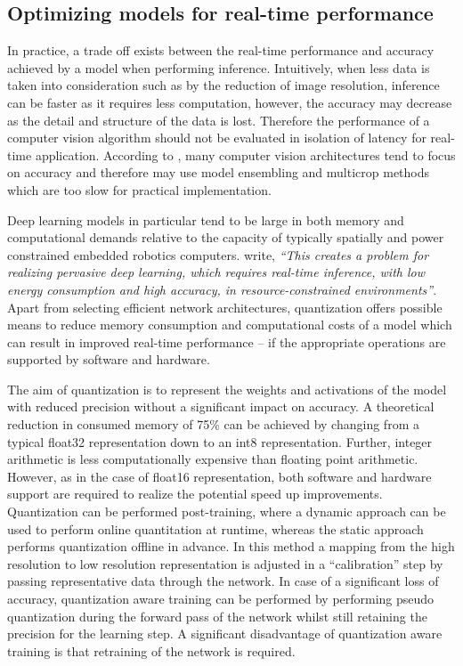 \documentclass[a4paper,twoside,12pt]{report}
\begin{document}
\newpage
\subsection{Optimizing models for real-time performance}

In practice, a trade off exists between the real-time performance and accuracy achieved by a model when performing inference. Intuitively, when less data is taken into consideration such as by the reduction of image resolution, inference can be faster as it requires less computation, however, the accuracy may decrease as the detail and structure of the data is lost. Therefore the performance of a computer vision algorithm should not be evaluated in isolation of latency for real-time application. According to \cite{speedacc}, many computer vision architectures tend to focus on accuracy and therefore may use model ensembling and multicrop methods which are too slow for practical implementation.

Deep learning models in particular tend to be large in both memory and computational demands relative to the capacity of typically spatially and power constrained embedded robotics computers. \cite{quantization} write, \textit{``This creates a problem for realizing pervasive deep learning, which requires real-time inference, with low energy consumption and high accuracy, in resource-constrained environments''}. Apart from selecting efficient network architectures, quantization offers possible means to reduce memory consumption and computational costs of a model which can result in improved real-time performance -- if the appropriate operations are supported by software and hardware.

The aim of quantization is to represent the weights and activations of the model with reduced precision without a significant impact on accuracy. A theoretical reduction in consumed memory of 75\% can be achieved by changing from a typical float32 representation down to an int8 representation. Further, integer arithmetic is less computationally expensive than floating point arithmetic. However, as in the case of float16 representation, both software and hardware support are required to realize the potential speed up improvements. Quantization can be performed post-training, where a dynamic approach can be used to perform online quantitation at runtime, whereas the static approach performs quantization offline in advance. In this method a mapping from the high resolution to low resolution representation is adjusted in a ``calibration'' step by passing representative data through the network. In case of a significant loss of accuracy, quantization aware training can be performed by performing pseudo quantization during the forward pass of the network whilst  still retaining the precision for the learning step. A significant disadvantage of quantization aware training is that retraining of the network is required. \citep{quantization}
\end{document}
